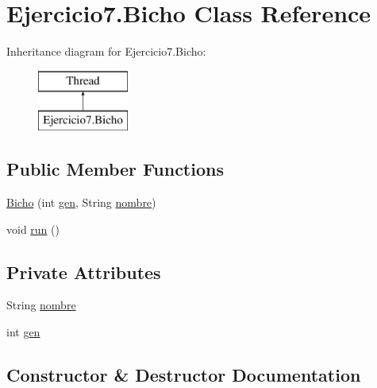 \hypertarget{class_ejercicio7_1_1_bicho}{}\section{Ejercicio7.\+Bicho Class Reference}
\label{class_ejercicio7_1_1_bicho}
Inheritance diagram for Ejercicio7.\+Bicho\+:\begin{figure}[H]
\begin{center}
\leavevmode
\includegraphics[height=2.000000cm]{class_ejercicio7_1_1_bicho}
\end{center}
\end{figure}
\subsection*{Public Member Functions}
\begin{DoxyCompactItemize}
\item 
\mbox{\hyperlink{class_ejercicio7_1_1_bicho_a03c84eeb81d02ea3573c8380368ab52c}{Bicho}} (int \mbox{\hyperlink{class_ejercicio7_1_1_bicho_a0cd88157aea1b2436f8328ae67383447}{gen}}, String \mbox{\hyperlink{class_ejercicio7_1_1_bicho_aa5bc3fb03f56e116638d14ceb590aecd}{nombre}})
\item 
void \mbox{\hyperlink{class_ejercicio7_1_1_bicho_aa1aefe543067b1a8ae1daf78c5ec24d2}{run}} ()
\end{DoxyCompactItemize}
\subsection*{Private Attributes}
\begin{DoxyCompactItemize}
\item 
String \mbox{\hyperlink{class_ejercicio7_1_1_bicho_aa5bc3fb03f56e116638d14ceb590aecd}{nombre}}
\item 
int \mbox{\hyperlink{class_ejercicio7_1_1_bicho_a0cd88157aea1b2436f8328ae67383447}{gen}}
\end{DoxyCompactItemize}


\subsection{Constructor \& Destructor Documentation}
\mbox{\label{class_ejercicio7_1_1_bicho_a03c84eeb81d02ea3573c8380368ab52c}} 
